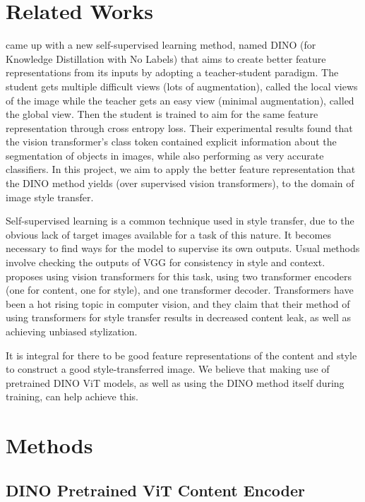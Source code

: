 \documentclass{article}
\begin{document}
\section{Related Works}

\cite{DINO} came up with a new self-supervised learning method, named DINO (for Knowledge Distillation with No Labels) that aims to create better feature representations from its inputs by adopting a teacher-student paradigm. The student gets multiple difficult views (lots of augmentation), called the local views of the image while the teacher gets an easy view (minimal augmentation), called the global view. Then the student is trained to aim for the same feature representation through cross entropy loss. Their experimental results found that the vision transformer's class token contained explicit information about the segmentation of objects in images, while also performing as very accurate classifiers. In this project, we aim to apply the better feature representation that the DINO method yields (over supervised vision transformers), to the domain of image style transfer.

Self-supervised learning is a common technique used in style transfer, due to the obvious lack of target images available for a task of this nature. It becomes necessary to find ways for the model to supervise its own outputs. Usual methods \cite{CNNStyleTransfer} involve checking the outputs of VGG for consistency in style and context. \cite{ImageStyleTransformer} proposes using vision transformers for this task, using two transformer encoders (one for content, one for style), and one transformer decoder. Transformers have been a hot rising topic in computer vision, and they claim that their method of using transformers for style transfer results in decreased content leak, as well as achieving unbiased stylization.

It is integral for there to be good feature representations of the content and style to construct a good style-transferred image. We believe that making use of pretrained DINO ViT models, as well as using the DINO method itself during training, can help achieve this.

\section{Methods}

\subsection{DINO Pretrained ViT Content Encoder}
\end{document}
